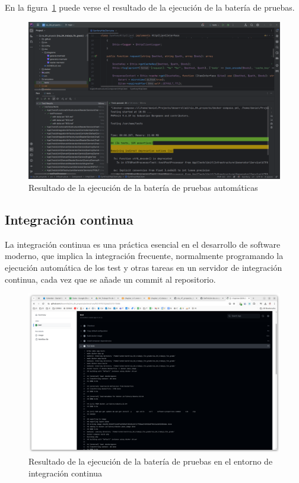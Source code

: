 En la figura~\ref{fig:chapter_4.5.test_suite_execution} puede verse el resultado de la ejecución de la batería de
pruebas.

\begin{figure}[ht]
    \begin{center}
        \includegraphics[width=\textwidth]{./chapter/4/images/chapter_4.5.test_suite_execution}
        \caption{Resultado de la ejecución de la batería de pruebas automáticas}
        \label{fig:chapter_4.5.test_suite_execution}
    \end{center}
\end{figure}

\subsection*{Integración continua}
La integración continua es una práctica esencial en el desarrollo de software moderno, que implica la integración
frecuente, normalmente programando la ejecución automática de los test y otras tareas en un servidor de integración
continua, cada vez que se añade un commit al repositorio.

\begin{figure}[ht]
    \begin{center}
        \includegraphics[width=\textwidth]{./chapter/4/images/chapter_4.5.github_actions_execution}
        \caption{Resultado de la ejecución de la batería de pruebas en el entorno de integración continua}
        \label{fig:chapter_4.5.github_actions_execution}
    \end{center}
\end{figure}

